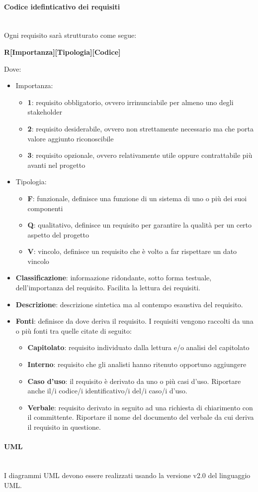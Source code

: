 \paragraph{Codice idefinticativo dei requisiti}\mbox{}\\
Ogni requisito sarà strutturato come segue:
\begin{center}
	\textbf{R[Importanza][Tipologia][Codice]}
\end{center}
Dove:
\begin{itemize}
		\item Importanza:
		\begin{itemize}
			\item \textbf{1}: requisito obbligatorio, ovvero irrinunciabile per almeno uno degli stakeholder
			\item \textbf{2}: requisito desiderabile, ovvero non strettamente necessario ma che porta valore aggiunto riconoscibile
			\item \textbf{3}: requisito opzionale, ovvero relativamente utile oppure contrattabile più avanti nel progetto
		\end{itemize}
		\item Tipologia:
		\begin{itemize}
			\item \textbf{F}: funzionale, definisce una funzione di un sistema di uno o più dei suoi componenti
			\item \textbf{Q}: qualitativo, definisce un requisito per garantire la qualità per un certo aspetto del progetto
			\item \textbf{V}: vincolo, definisce un requisito che è volto a far rispettare un dato vincolo
		\end{itemize}
	\item \textbf{Classificazione}: informazione ridondante, sotto forma testuale, dell’importanza del requisito. Facilita la lettura dei requisiti.
	\item \textbf{Descrizione}: descrizione sintetica ma al contempo esaustiva del requisito.
	\item \textbf{Fonti}: definisce da dove deriva il requisito. I requisiti vengono raccolti da una o più fonti tra quelle citate di seguito:
	\begin{itemize}
		\item \textbf{Capitolato}: requisito individuato dalla lettura e/o analisi del capitolato
		\item \textbf{Interno}: requisito che gli analisti hanno ritenuto opportuno aggiungere
		\item \textbf{Caso d’uso}: il requisito è derivato da uno o più casi d’uso. Riportare anche il/i codice/i identificativo/i del/i caso/i d’uso.
		\item \textbf{Verbale}: requisito derivato in seguito ad una richiesta di chiarimento con il committente. Riportare il nome del documento del verbale da cui deriva il requisito in questione.		
	\end{itemize}
\end{itemize}
\paragraph{UML}\mbox{}\\
I diagrammi UML devono essere realizzati usando la versione v2.0 del linguaggio UML.

